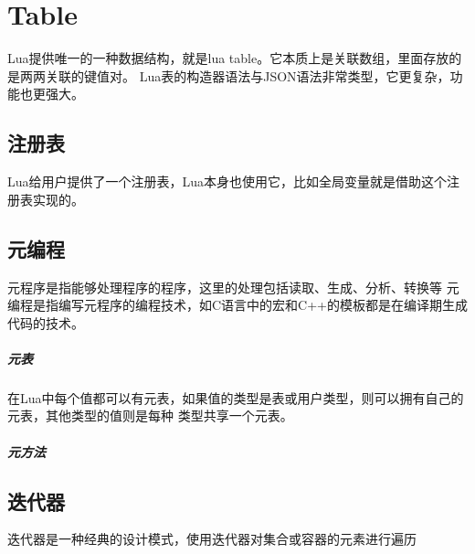 \chapter{Table}

Lua提供唯一的一种数据结构，就是lua table。它本质上是关联数组，里面存放的是两两关联的键值对。
Lua表的构造器语法与JSON语法非常类型，它更复杂，功能也更强大。

\section{注册表}

Lua给用户提供了一个注册表，Lua本身也使用它，比如全局变量就是借助这个注册表实现的。

\section{元编程}
元程序是指能够处理程序的程序，这里的处理包括读取、生成、分析、转换等
元编程是指编写元程序的编程技术，如C语言中的宏和C++的模板都是在编译期生成代码的技术。

\paragraph{元表}
在Lua中每个值都可以有元表，如果值的类型是表或用户类型，则可以拥有自己的元表，其他类型的值则是每种
类型共享一个元表。

\paragraph{元方法}

\section{迭代器}
迭代器是一种经典的设计模式，使用迭代器对集合或容器的元素进行遍历